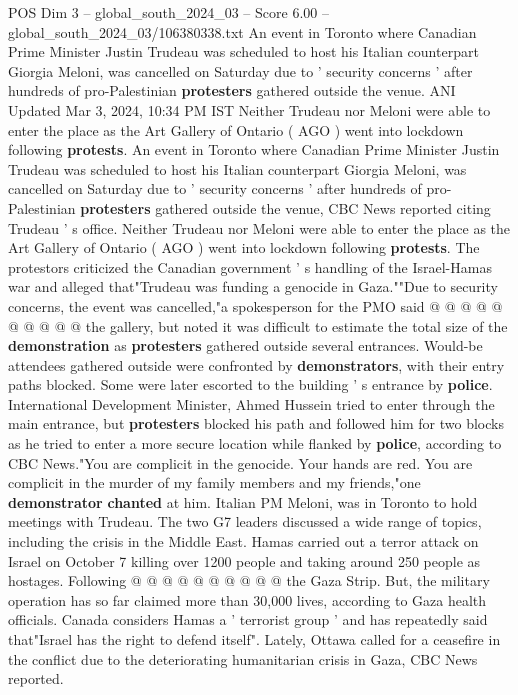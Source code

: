\begin{textsample}{POS Dim 3 – global\_south\_2024\_03 – Score 6.00 – global\_south\_2024\_03/106380338.txt}  \label{ex:f3_pos_426}
An event in Toronto where Canadian Prime Minister Justin Trudeau was scheduled to host his Italian counterpart Giorgia Meloni, was cancelled on Saturday due to ' security concerns ' after hundreds of pro-Palestinian \textbf{protesters} gathered outside the venue.
ANI Updated Mar 3, 2024, 10:34 PM IST Neither Trudeau nor Meloni were able to enter the place as the Art Gallery of Ontario ( AGO ) went into lockdown following \textbf{protests}.
An event in Toronto where Canadian Prime Minister Justin Trudeau was scheduled to host his Italian counterpart Giorgia Meloni, was cancelled on Saturday due to ' security concerns ' after hundreds of pro-Palestinian \textbf{protesters} gathered outside the venue, CBC News reported citing Trudeau ' s office.
Neither Trudeau nor Meloni were able to enter the place as the Art Gallery of Ontario ( AGO ) went into lockdown following \textbf{protests}.
The protestors criticized the Canadian government ' s handling of the Israel-Hamas war and alleged that"Trudeau was funding a genocide in Gaza.""Due to security concerns, the event was cancelled,"a spokesperson for the PMO said @ @ @ @ @ @ @ @ @ @ the gallery, but noted it was difficult to estimate the total size of the \textbf{demonstration} as \textbf{protesters} gathered outside several entrances.
Would-be attendees gathered outside were confronted by \textbf{demonstrators}, with their entry paths blocked.
Some were later escorted to the building ' s entrance by \textbf{police}.
International Development Minister, Ahmed Hussein tried to enter through the main entrance, but \textbf{protesters} blocked his path and followed him for two blocks as he tried to enter a more secure location while flanked by \textbf{police}, according to CBC News."You are complicit in the genocide.
Your hands are red.
You are complicit in the murder of my family members and my friends,"one \textbf{demonstrator} \textbf{chanted} at him.
Italian PM Meloni, was in Toronto to hold meetings with Trudeau.
The two G7 leaders discussed a wide range of topics, including the crisis in the Middle East.
Hamas carried out a terror attack on Israel on October 7 killing over 1200 people and taking around 250 people as hostages.
Following @ @ @ @ @ @ @ @ @ @ the Gaza Strip.
But, the military operation has so far claimed more than 30,000 lives, according to Gaza health officials.
Canada considers Hamas a ' terrorist group ' and has repeatedly said that"Israel has the right to defend itself".
Lately, Ottawa called for a ceasefire in the conflict due to the deteriorating humanitarian crisis in Gaza, CBC News reported.

\end{textsample}
